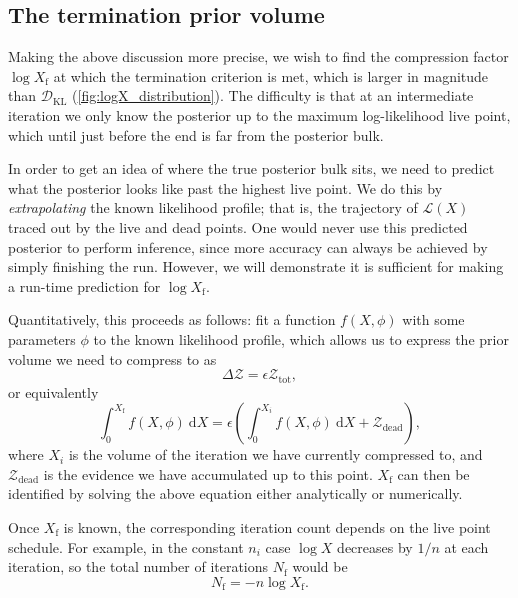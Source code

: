 \documentclass[usenatbib]{mnras}
\newcommand{\nlive}{n_i}
\newcommand{\Like}{\mathcal{L}}
\newcommand{\DKL}{\mathcal{D}_\mathrm{KL}}
\begin{document}
\subsection{The termination prior volume}\label{sec:termination}
Making the above discussion more precise, we wish to find the compression factor $\log X_ \mathrm{f}$ at which the termination criterion is met, which is larger in magnitude than $\DKL$ (\cref{fig:logX_distribution}). The difficulty is that at an intermediate iteration we only know the posterior up to the maximum log-likelihood live point, which until just before the end is far from the posterior bulk. 
\par
In order to get an idea of where the true posterior bulk sits, we need to predict what the posterior looks like past the highest live point. We do this by \textit{extrapolating} the known likelihood profile; that is, the trajectory of $\Like(X)$ traced out by the live and dead points. 
One would never use this predicted posterior to perform inference, since more accuracy can always be achieved by simply finishing the run. However, we will demonstrate it is sufficient for making a run-time prediction for $\log X_\mathrm{f}$. 
\par
Quantitatively, this proceeds as follows: fit a function $f(X, \phi)$  with some parameters $\phi$ to the known likelihood profile, which allows us to express the prior volume we need to compress to as
\begin{equation}
	\Delta \mathcal{Z} = \epsilon \mathcal{Z}_\mathrm{tot},
\end{equation}
or equivalently
\begin{equation}\label{endpoint}
	\int_0^{X_\mathrm{f}} f(X, \phi)\ \mathrm{d}X = \epsilon \left( \int_0^{X_i} f(X, \phi)\ \mathrm{d}X + \mathcal{Z}_\mathrm{dead} \right),
\end{equation}
where $X_i$ is the volume of the iteration we have currently compressed to, and $\mathcal{Z}_\mathrm{dead}$ is the evidence we have accumulated up to this point. $X_\mathrm{f}$ can then be identified by solving the above equation either analytically or numerically. 
\par
Once $X_\mathrm{f}$ is known, the corresponding iteration count depends on the live point schedule. For example, in the constant $\nlive$ case $\log X$ decreases by $1/n$ at each iteration, so the total number of iterations $N_\mathrm{f}$ would be
\begin{equation}\label{eq:Nf}
	N_\mathrm{f} = - n\log X_\mathrm{f}.
\end{equation}
\end{document}
